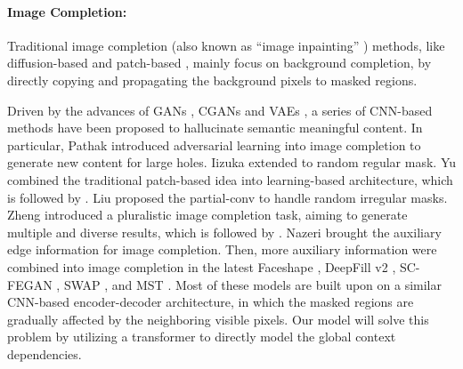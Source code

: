\documentclass[10pt,twocolumn,letterpaper]{article}
\begin{document}
\paragraph{Image Completion:} Traditional image completion (also known as ``image inpainting'' \cite{bertalmio2000image}) methods, like diffusion-based \cite{ballester2001filling,levin2003learning,bertalmio2003simultaneous} and patch-based \cite{criminisi2004region,jia2004inference,barnes2009patchmatch}, mainly focus on background completion, by directly copying and propagating the background pixels to masked regions. 

Driven by the advances of GANs \cite{goodfellow2014generative}, CGANs \cite{mirza2014conditional} and VAEs \cite{Kingma2014}, a series of CNN-based methods \cite{pathak2016context,iizuka2017globally,yu2018generative,Liu_2018_ECCV,Zheng_2019_CVPR,Nazeri_2019_ICCV} have been proposed to hallucinate semantic meaningful content. In particular, Pathak \etal \cite{pathak2016context} introduced adversarial learning into image completion to generate new content for large holes. Iizuka \etal \cite{iizuka2017globally} extended \cite{pathak2016context}  to random regular mask. Yu \etal \cite{yu2018generative} combined the traditional patch-based idea into learning-based architecture, which is followed by \cite{song2018contextual,song2018spg,Zheng_2019_CVPR,yi2020contextual,zeng2020high,zeng2021generative}. Liu \etal \cite{Liu_2018_ECCV} proposed the partial-conv to handle random irregular masks. Zheng \etal introduced a pluralistic image completion task, aiming to generate multiple and diverse results, which is followed by \cite{zhao2020uctgan,peng2021generating,liu2021pd,Wan_2021_ICCV}. Nazeri \etal \cite{Nazeri_2019_ICCV} brought the auxiliary edge information for image completion. Then, more auxiliary information were combined into image completion in the latest Faceshape \cite{portenier2018faceshop}, DeepFill v2 \cite{yu2019free}, SC-FEGAN \cite{jo2019sc}, SWAP \cite{liao2021image}, and MST \cite{Cao_2021_ICCV}. Most of these models are built upon on a similar CNN-based encoder-decoder architecture, in which the masked regions are gradually affected by the neighboring visible pixels. Our model will solve this problem by utilizing a transformer to directly model the global context dependencies. 
\end{document}
